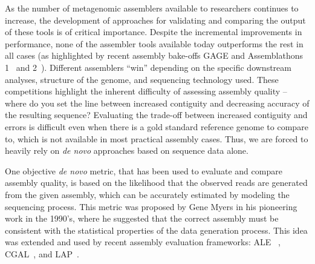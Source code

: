 As the number of metagenomic assemblers available to researchers continues to increase, the development of approaches for validating and comparing the output of these tools is of critical importance.
Despite the incremental improvements in performance, none of the assembler tools available today outperforms the rest in all cases (as highlighted by recent assembly
bake-offs GAGE\cite{salzberg2011gage} and Assemblathons 1~\cite{earl2011assemblathon} and 2~\cite{bradnam2013assemblathon}).
Different assemblers ``win'' depending on the specific downstream analyses, structure of the genome, and sequencing technology used.
These competitions highlight the inherent difficulty of assessing assembly quality -- where do you set the line between increased contiguity and decreasing accuracy of the resulting sequence?
Evaluating the trade-off between increased contiguity and errors is difficult even when there is a gold standard reference genome to compare to, which is not available in most practical assembly cases.
Thus, we are forced to heavily rely on \emph{de novo} approaches based on sequence data alone.

One objective \emph{de novo} metric, that has been used to evaluate and compare assembly quality, is based on the likelihood that the observed reads are generated from the given assembly, which can be accurately estimated by modeling the sequencing process.
This metric was proposed by Gene Myers in his pioneering work in the 1990's, where he suggested that the correct assembly must be consistent with the statistical properties of the data generation process.
This idea was extended and used by recent assembly evaluation frameworks: ALE ~\cite{clark2013ale}, CGAL~\cite{rahman2013cgal}, and LAP~\cite{LAP}.



